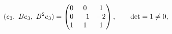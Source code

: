 \documentclass[preview]{standalone}
\begin{document}
\begin{align*}
\special{dvisvgm:raw <g id='unique000'>}(e_3,\ B e_3,\ B^2 e_3)=\begin{pmatrix}0&0&1\\0&-1&-2\\1&1&1\end{pmatrix},\qquad \det=1\neq 0,\special{dvisvgm:raw </g>}
\end{align*}
\end{document}
